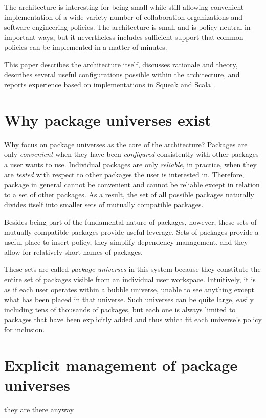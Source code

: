 \documentclass{article}
\begin{document}
The architecture is interesting for being small while still allowing
convenient implementation of a wide variety number of collaboration
organizations and software-engineering policies.  The architecture is
small and is policy-neutral in important ways, but it nevertheless
includes sufficient support that common policies can be implemented in
a matter of minutes.

This paper describes the architecture itself, discusses rationale and
theory, describes several useful configurations possible within the
architecture, and reports experience based on implementations in
Squeak \cite{ingalls97:future} and Scala \cite{odersky04:scala}.



\section{Why package universes exist}


Why focus on package universes as the core of the architecture?
Packages are only \emph{convenient} when they have been
\emph{configured} consistently with other packages a user wants to
use.  Individual packages are only \emph{reliable}, in practice, when
they are \emph{tested} with respect to other packages the user is
interested in.  Therefore, package in general cannot be convenient and
cannot be reliable except in relation to a set of other packages.
As a result, the set of all possible packages naturally divides itself into
smaller sets of mutually compatible packages.

Besides being part of the fundamental nature of packages, however,
these sets of mutually compatible packages provide useful leverage.
Sets of packages provide a useful place to insert policy, they
simplify dependency management, and they allow for relatively short
names of packages.

These sets are called \emph{package universes} in this system because
they constitute the entire set of packages visible from an individual
user workspace.  Intuitively, it is as if each user operates within a
bubble universe, unable to see anything except what has been placed in
that universe.  Such universes can be quite large, easily including
tens of thousands of packages, but each one is always limited to
packages that have been explicitly added and thus which fit each
universe's policy for inclusion.



\section{Explicit management of package universes}
    they are there anyway
\end{document}
